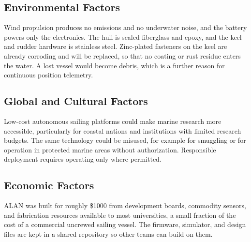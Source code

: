\subsection{Environmental Factors}
Wind propulsion produces no emissions and no underwater noise, and the battery
powers only the electronics. The hull is sealed fiberglass and epoxy, and the
keel and rudder hardware is stainless steel. Zinc-plated fasteners on the keel
are already corroding and will be replaced, so that no coating or rust
residue enters the water. A lost vessel would become debris, which is a
further reason for continuous position telemetry.

\subsection{Global and Cultural Factors}
Low-cost autonomous sailing platforms could make marine research more
accessible, particularly for coastal nations and institutions with limited
research budgets. The same technology could be misused, for example for
smuggling or for operation in protected marine areas without authorization.
Responsible deployment requires operating only where permitted.

\subsection{Economic Factors}
ALAN was built for roughly \$1000 from development boards, commodity sensors,
and fabrication resources available to most universities, a small fraction
of the cost of a commercial uncrewed sailing vessel. The firmware, simulator,
and design files are kept in a shared repository so other teams can build on
them.

